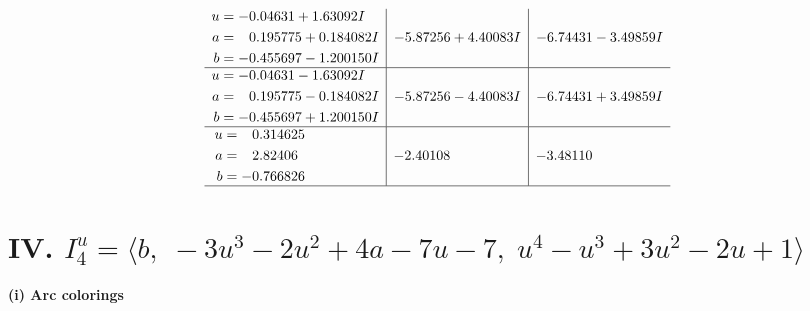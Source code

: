 \documentclass[1p]{elsarticle_modified}
\theoremstyle{definition}
\begin{document}
$$\begin{array}{c|c|c}
\begin{aligned}
u &= -0.04631 + 1.63092 I \\
a &= \phantom{-}0.195775 + 0.184082 I \\
b &= -0.455697 - 1.200150 I\end{aligned}
 & -5.87256 + 4.40083 I & -6.74431 - 3.49859 I \\ \hline\begin{aligned}
u &= -0.04631 - 1.63092 I \\
a &= \phantom{-}0.195775 - 0.184082 I \\
b &= -0.455697 + 1.200150 I\end{aligned}
 & -5.87256 - 4.40083 I & -6.74431 + 3.49859 I \\ \hline\begin{aligned}
u &= \phantom{-}0.314625\phantom{ +0.000000I} \\
a &= \phantom{-}2.82406\phantom{ +0.000000I} \\
b &= -0.766826\phantom{ +0.000000I}\end{aligned}
 & -2.40108\phantom{ +0.000000I} & -3.48110\phantom{ +0.000000I}\\
 \hline 
 \end{array}$$\newpage\newpage\renewcommand{\arraystretch}{1}
\centering \section*{IV. $I^u_{4}= \langle b,\;-3 u^3-2 u^2+4 a-7 u-7,\;u^4- u^3+3 u^2-2 u+1 \rangle$}
\flushleft \textbf{(i) Arc colorings}\\
\end{document}
